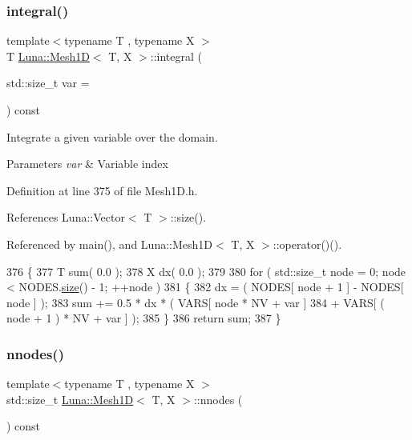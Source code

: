 \subsubsection{\texorpdfstring{integral()}{integral()}}
{\footnotesize\ttfamily template$<$typename T , typename X $>$ \\
T \hyperlink{classLuna_1_1Mesh1D}{Luna\+::\+Mesh1D}$<$ T, X $>$\+::integral (\begin{DoxyParamCaption}\item[{std\+::size\+\_\+t}]{var = {} }\end{DoxyParamCaption}) const\hspace{0.3cm}{\ttfamily [inline]}}



Integrate a given variable over the domain. 


\begin{DoxyParams}{Parameters}
{\em var} & Variable index \\
\hline
\end{DoxyParams}


Definition at line 375 of file Mesh1\+D.\+h.



References Luna\+::\+Vector$<$ T $>$\+::size().



Referenced by main(), and Luna\+::\+Mesh1\+D$<$ T, X $>$\+::operator()().


\begin{DoxyCode}
376   \{
377     T sum( 0.0 );
378     X dx( 0.0 );
379 
380     \textcolor{keywordflow}{for} ( std::size\_t node = 0; node < NODES.\hyperlink{classLuna_1_1Vector_ac9b6ed7a0df401728f27c193fbc8f4d8}{size}() - 1; ++node )
381     \{
382       dx = ( NODES[ node + 1 ] - NODES[ node ] );
383       sum += 0.5 * dx * ( VARS[ node * NV + var ]
384                         + VARS[ ( node + 1 ) * NV + var ] );
385     \}
386     \textcolor{keywordflow}{return} sum;
387   \}
\end{DoxyCode}
\mbox{\label{classLuna_1_1Mesh1D_a83cb9003736324ec955fb091c20dee4b}} 
\subsubsection{\texorpdfstring{nnodes()}{nnodes()}}
{\footnotesize\ttfamily template$<$typename T , typename X $>$ \\
std\+::size\+\_\+t \hyperlink{classLuna_1_1Mesh1D}{Luna\+::\+Mesh1D}$<$ T, X $>$\+::nnodes (\begin{DoxyParamCaption}{ }\end{DoxyParamCaption}) const\hspace{0.3cm}{\ttfamily [inline]}}



